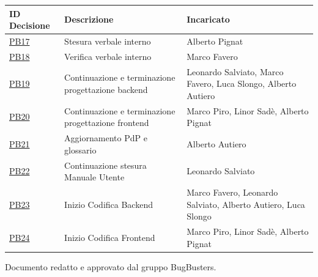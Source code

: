 \documentclass[a4paper,12pt]{article}
\begin{document}
\sloppy
\begin{tabularx}{\textwidth}{
    |>{\raggedright\arraybackslash}p{3cm}|
    >{\raggedright\arraybackslash}X|
    >{\raggedright\arraybackslash}p{3cm}|
}
\hline
\rowcolor{primaryblue!40}
\textbf{\color{white} ID Decisione} & \textbf{\color{white} Descrizione} & \textbf{\color{white} Incaricato} \\

\hline
\rowcolor{secondaryblue!10} \href{https://github.com/BugBustersUnipd/DocumentazioneSWE/issues/213}{PB17}  & Stesura verbale interno & Alberto Pignat \\
\hline
\rowcolor{secondaryblue!10} \href{https://github.com/BugBustersUnipd/DocumentazioneSWE/issues/214}{PB18} & Verifica verbale interno & Marco Favero  \\
\hline
\rowcolor{secondaryblue!10} \href{https://github.com/BugBustersUnipd/DocumentazioneSWE/issues/215}{PB19}  & Continuazione e terminazione progettazione backend & Leonardo Salviato, Marco Favero, Luca Slongo, Alberto Autiero\\
\hline
\rowcolor{secondaryblue!10} \href{https://github.com/BugBustersUnipd/DocumentazioneSWE/issues/216}{PB20} & Continuazione e terminazione progettazione frontend & Marco Piro, Linor Sadè, Alberto Pignat \\
\hline
\rowcolor{secondaryblue!10} \href{https://github.com/BugBustersUnipd/DocumentazioneSWE/issues/217}{PB21} & Aggiornamento PdP e glossario & Alberto Autiero  \\
\hline
\rowcolor{secondaryblue!10} \href{https://github.com/BugBustersUnipd/DocumentazioneSWE/issues/218}{PB22} & Continuazione stesura Manuale Utente & Leonardo Salviato  \\
\hline
\rowcolor{secondaryblue!10} \href{https://github.com/BugBustersUnipd/DocumentazioneSWE/issues/219}{PB23} & Inizio Codifica Backend & Marco Favero, Leonardo Salviato, Alberto Autiero, Luca Slongo \\
\hline
\rowcolor{secondaryblue!10} \href{https://github.com/BugBustersUnipd/DocumentazioneSWE/issues/220}{PB24} & Inizio Codifica Frontend & Marco Piro, Linor Sadè, Alberto Pignat \\
\hline



\end{tabularx}
\fussy

\vfill
\begin{center}
    {\small\color{darkgray} Documento redatto e approvato dal gruppo BugBusters.}
\end{center}
\end{document}

